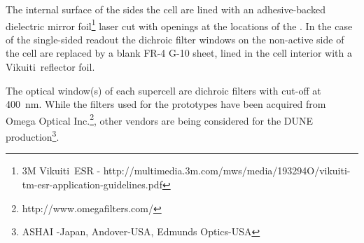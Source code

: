 

The  internal surface of the sides the cell are lined with an adhesive-backed dielectric mirror foil\footnote{3M Vikuiti\texttrademark\  ESR - http://multimedia.3m.com/mws/media/193294O/vikuiti-tm-esr-application-guidelines.pdf} laser cut with openings at the locations of the .  In the case of the single-sided readout the dichroic filter windows on the non-active side of the cell are replaced by a blank FR-4 G-10 sheet, lined in the cell interior with a Vikuiti\texttrademark\ reflector foil. %


The optical window(s) of each supercell are dichroic filters with cut-off at \SI{400}{nm}. While the filters used for the  prototypes have been acquired from Omega Optical Inc.\footnote{http://www.omegafilters.com/}, other vendors are being considered for the DUNE production\footnote{ASHAI -Japan, Andover-USA, Edmunds Optics-USA}.
   

